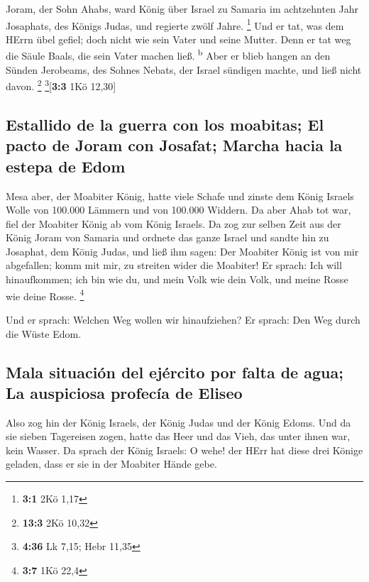  Joram, der Sohn Ahabs, ward König über Israel zu Samaria
im achtzehnten Jahr Josaphats, des Königs Judas, und regierte zwölf
Jahre. \footnote{\textbf{3:1} 2Kö 1,17}  Und er tat, was
dem HErrn übel gefiel; doch nicht wie sein Vater und seine Mutter. Denn
er tat weg die Säule Baals, die sein Vater machen ließ.
\textsuperscript{b}  Aber er blieb hangen an den Sünden
Jerobeams, des Sohnes Nebats, der Israel sündigen machte, und ließ nicht
davon. \footnote{\textbf{13:3} 2Kö 10,32} \footnote{\textbf{4:36} Lk
  7,15; Hebr 11,35}{[}\textbf{3:3} 1Kö 12,30{]}

\hypertarget{estallido-de-la-guerra-con-los-moabitas-el-pacto-de-joram-con-josafat-marcha-hacia-la-estepa-de-edom}{%
\subsection{Estallido de la guerra con los moabitas; El pacto de Joram
con Josafat; Marcha hacia la estepa de
Edom}\label{estallido-de-la-guerra-con-los-moabitas-el-pacto-de-joram-con-josafat-marcha-hacia-la-estepa-de-edom}}

 Mesa aber, der Moabiter König, hatte viele Schafe und
zinste dem König Israels Wolle von 100.000 Lämmern und von 100.000
Widdern.  Da aber Ahab tot war, fiel der Moabiter König ab
vom König Israels.  Da zog zur selben Zeit aus der König
Joram von Samaria und ordnete das ganze Israel  und sandte
hin zu Josaphat, dem König Judas, und ließ ihm sagen: Der Moabiter König
ist von mir abgefallen; komm mit mir, zu streiten wider die Moabiter! Er
sprach: Ich will hinaufkommen; ich bin wie du, und mein Volk wie dein
Volk, und meine Rosse wie deine Rosse. \footnote{\textbf{3:7} 1Kö 22,4}

 Und er sprach: Welchen Weg wollen wir hinaufziehen? Er
sprach: Den Weg durch die Wüste Edom.

\hypertarget{mala-situaciuxf3n-del-ejuxe9rcito-por-falta-de-agua-la-auspiciosa-profecuxeda-de-eliseo}{%
\subsection{Mala situación del ejército por falta de agua; La auspiciosa
profecía de
Eliseo}\label{mala-situaciuxf3n-del-ejuxe9rcito-por-falta-de-agua-la-auspiciosa-profecuxeda-de-eliseo}}

 Also zog hin der König Israels, der König Judas und der
König Edoms. Und da sie sieben Tagereisen zogen, hatte das Heer und das
Vieh, das unter ihnen war, kein Wasser.  Da sprach der
König Israels: O wehe! der HErr hat diese drei Könige geladen, dass er
sie in der Moabiter Hände gebe.

